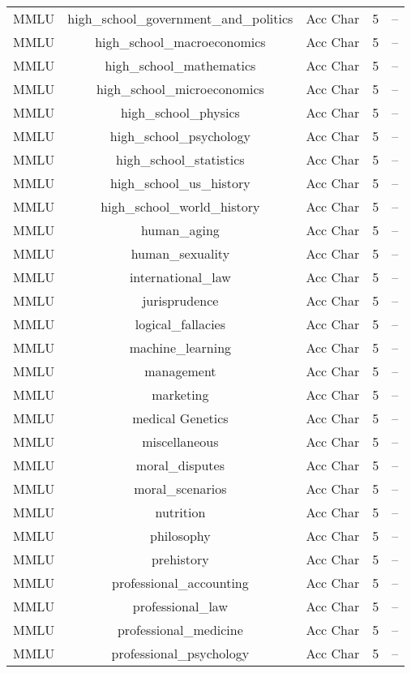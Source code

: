 \begin{longtable}{|c|c|c|c|c|}
    MMLU & high\_school\_government\_and\_politics & Acc Char & 5 & -- \\
    MMLU & high\_school\_macroeconomics & Acc Char & 5 & -- \\
    MMLU & high\_school\_mathematics & Acc Char & 5 & -- \\
    MMLU & high\_school\_microeconomics & Acc Char & 5 & -- \\
    MMLU & high\_school\_physics & Acc Char & 5 & -- \\
    MMLU & high\_school\_psychology & Acc Char & 5 & -- \\
    MMLU & high\_school\_statistics & Acc Char & 5 & -- \\
    MMLU & high\_school\_us\_history & Acc Char & 5 & -- \\
    MMLU & high\_school\_world\_history & Acc Char & 5 & -- \\
    MMLU & human\_aging & Acc Char & 5 & -- \\
    MMLU & human\_sexuality & Acc Char & 5 & -- \\
    MMLU & international\_law & Acc Char & 5 & -- \\
    MMLU & jurisprudence & Acc Char & 5 & -- \\
    MMLU & logical\_fallacies & Acc Char & 5 & -- \\
    MMLU & machine\_learning & Acc Char & 5 & -- \\
    MMLU & management & Acc Char & 5 & -- \\
    MMLU & marketing & Acc Char & 5 & -- \\
    MMLU & medical Genetics & Acc Char & 5 & -- \\
    MMLU & miscellaneous & Acc Char & 5 & -- \\
    MMLU & moral\_disputes & Acc Char & 5 & -- \\
    MMLU & moral\_scenarios & Acc Char & 5 & -- \\
    MMLU & nutrition & Acc Char & 5 & -- \\
    MMLU & philosophy & Acc Char & 5 & -- \\
    MMLU & prehistory & Acc Char & 5 & -- \\
    MMLU & professional\_accounting & Acc Char & 5 & -- \\
    MMLU & professional\_law & Acc Char & 5 & -- \\
    MMLU & professional\_medicine & Acc Char & 5 & -- \\
    MMLU & professional\_psychology & Acc Char & 5 & -- \\

\end{longtable}
